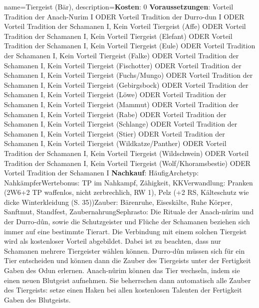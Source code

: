 {
    name={Tiergeist (Bär)},
    description={\textbf{Kosten}: 0 \textbf{Voraussetzungen}: Vorteil Tradition der Anach-Nurim I ODER Vorteil Tradition der Durro-dun I ODER Vorteil Tradition der Schamanen I, Kein Vorteil Tiergeist (Affe) ODER Vorteil Tradition der Schamanen I, Kein Vorteil Tiergeist (Elefant) ODER Vorteil Tradition der Schamanen I, Kein Vorteil Tiergeist (Eule) ODER Vorteil Tradition der Schamanen I, Kein Vorteil Tiergeist (Falke) ODER Vorteil Tradition der Schamanen I, Kein Vorteil Tiergeist (Fischotter) ODER Vorteil Tradition der Schamanen I, Kein Vorteil Tiergeist (Fuchs/Mungo) ODER Vorteil Tradition der Schamanen I, Kein Vorteil Tiergeist (Gebirgsbock) ODER Vorteil Tradition der Schamanen I, Kein Vorteil Tiergeist (Löwe) ODER Vorteil Tradition der Schamanen I, Kein Vorteil Tiergeist (Mammut) ODER Vorteil Tradition der Schamanen I, Kein Vorteil Tiergeist (Rabe) ODER Vorteil Tradition der Schamanen I, Kein Vorteil Tiergeist (Schlange) ODER Vorteil Tradition der Schamanen I, Kein Vorteil Tiergeist (Stier) ODER Vorteil Tradition der Schamanen I, Kein Vorteil Tiergeist (Wildkatze/Panther) ODER Vorteil Tradition der Schamanen I, Kein Vorteil Tiergeist (Wildschwein) ODER Vorteil Tradition der Schamanen I, Kein Vorteil Tiergeist (Wolf/Khoramsbestie) ODER Vorteil Tradition der Schamanen I \textbf{Nachkauf}: Häufig\newline Archetyp: Nahkämpfer\newline Wertebonus: TP im Nahkampf, Zähigkeit, KK\newline Verwandlung: Pranken (2W6+2 TP waffenlos, nicht zerbrechlich, RW 1), Pelz (+2 RS, Kälteschutz wie dicke Winterkleidung (S. 35))\newline Zauber: Bärenruhe, Eiseskälte, Ruhe Körper, Sanftmut, Standfest, Zaubernahrung\newline Sephrasto: Die Rituale der Anach-nûrim und der Durro-dûn, sowie die Schutzgeister und Flüche der Schamanen beziehen sich immer auf eine bestimmte Tierart. Die Verbindung mit einem solchen Tiergeist wird als kostenloser Vorteil abgebildet. Dabei ist zu beachten, dass nur Schamanen mehrere Tiergeister wählen können. Durro-dûn müssen sich für ein Tier entscheiden und können dann die Zauber des Tiergeists unter der Fertigkeit Gaben des Odun erlernen. Anach-nûrim können das Tier wechseln, indem sie einen neuen Blutgeist aufnehmen. Sie beherrschen dann automatisch alle Zauber des Tiergeists: setze einen Haken bei allen kostenlosen Talenten der Fertigkeit Gaben des Blutgeists.}
}


